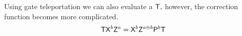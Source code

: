 \begin{remark}
Using gate teleportation we can also evaluate a  ${\sf T},$ however, the correction function becomes more complicated.
						$${\sf T} {\sf X}^b {\sf Z}^a= {\sf X}^b {\sf Z}^{a\oplus b} {\sf P}^b {\sf T}$$
\end{remark}				



